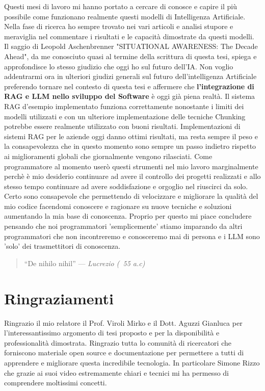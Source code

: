 \documentclass[12pt,a4paper,openright,twoside]{book}
\begin{document}
Questi mesi di lavoro mi hanno portato a cercare di conosce e capire il più possibile come funzionano realmente questi modelli di Intelligenza Artificiale.
Nella fase di ricerca ho sempre trovato nei vari articoli e analisi stupore e meraviglia nel commentare i risultati e le capacità dimostrate da questi modelli.
Il saggio di Leopold Aschenbrenner \cite{Aschenbrenner2024} "SITUATIONAL AWARENESS: The Decade Ahead", da me conosciuto quasi al termine della scrittura di questa tesi, spiega e approfondisce lo stesso giudizio che oggi ho sul futuro dell'IA.
Non voglio addentrarmi ora in ulteriori giudizi generali sul futuro dell'intelligenza Artificiale preferendo tornare nel contesto di questa tesi e affermere che \textbf{l'integrazione di RAG e LLM nello sviluppo del Software} è oggi già piena realtà.
Il sistema RAG d'esempio implementato funziona correttamente nonostante i limiti dei modelli utilizzati e con un ulteriore implementazione delle tecniche Chunking potrebbe essere realmente utilizzato con buoni risultati.
Implementazioni di sistemi RAG per le aziende oggi danno ottimi risultati,
ma resta sempre il peso e la consapevolezza che in questo momento sono sempre un passo indietro rispetto ai miglioramenti globali che
giornalmente vengono rilasciati.
Come programmatore al momento userò questi strumenti nel mio lavoro marginalmente perchè è mio desiderio continuare ad avere il controllo dei progetti realizzati e allo stesso tempo continuare ad avere soddisfazione e orgoglio nel riuscirci da solo.
Certo sono consapevole che permettendo di velocizzare e migliorare la qualità del mio codice facendomi conoscere e ragionare su nuove tecniche e soluzioni aumentando la mia base di conoscenza.
Proprio per questo mi piace concludere pensando che noi programmatori 'semplicemente' stiamo imparando da altri programmatori che non incontreremo e conosceremo mai di persona e i LLM sono 'solo' dei trasmettitori di conoscenza.

\begin{quote}
    “De nihilo nihil”
    \hfill--- \textit{Lucrezio (~55 a.c) }
\end{quote}

\chapter{Ringraziamenti}
Ringrazio il mio relatore il Prof. Viroli Mirko e il Dott. Aguzzi Gianluca per l'interessantissimo argomento di tesi proposto e per la disponibilità e professionalità dimostrata.
Ringrazio tutta lo comunità di ricercatori che forniscono materiale open source e documentazione per permettere a tutti di apprendere e migliorare questa incredibile tecnologia. In particolare Simone Rizzo che grazie ai suoi video estremamente chiari e tecnici mi ha permesso di comprendere moltissimi concetti.
\end{document}
